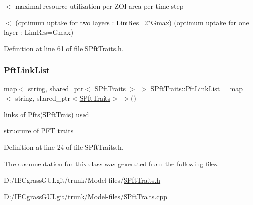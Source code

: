 $<$ maximal resource utilization per Z\+OI area per time step 

$<$ (optimum uptake for two layers \+: Lim\+Res=2$\ast$\+Gmax) (optimum uptake for one layer \+: Lim\+Res=Gmax) 

Definition at line 61 of file S\+Pft\+Traits.\+h.

\mbox{\label{class_s_pft_traits_a01285892bf49cb3af31aad380de299ef}} 
\subsubsection{\texorpdfstring{PftLinkList}{PftLinkList}}
{\footnotesize\ttfamily map$<$ string, shared\+\_\+ptr$<$ \mbox{\hyperlink{class_s_pft_traits}{S\+Pft\+Traits}} $>$ $>$ S\+Pft\+Traits\+::\+Pft\+Link\+List = map$<$ string, shared\+\_\+ptr$<$\mbox{\hyperlink{class_s_pft_traits}{S\+Pft\+Traits}}$>$ $>$()\hspace{0.3cm}{\ttfamily [static]}}



links of Pfts(\+S\+Pft\+Trais) used 

structure of P\+FT traits 

Definition at line 24 of file S\+Pft\+Traits.\+h.



The documentation for this class was generated from the following files\+:\begin{DoxyCompactItemize}
\item 
D\+:/\+I\+B\+Cgrass\+G\+U\+I.\+git/trunk/\+Model-\/files/\mbox{\hyperlink{_s_pft_traits_8h}{S\+Pft\+Traits.\+h}}\item 
D\+:/\+I\+B\+Cgrass\+G\+U\+I.\+git/trunk/\+Model-\/files/\mbox{\hyperlink{_s_pft_traits_8cpp}{S\+Pft\+Traits.\+cpp}}\end{DoxyCompactItemize}
